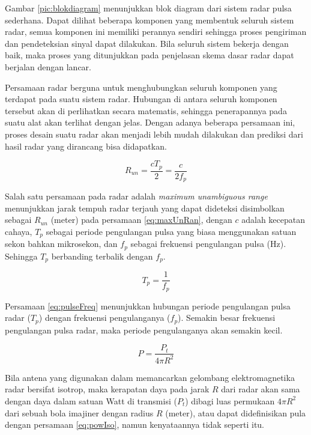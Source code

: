 Gambar \ref{pic:blokdiagram} menunjukkan blok diagram dari sistem radar pulsa sederhana. Dapat dilihat beberapa komponen yang membentuk seluruh sistem radar, semua komponen ini memiliki perannya sendiri sehingga proses pengiriman dan pendeteksian sinyal dapat dilakukan.  Bila seluruh sistem bekerja dengan baik, maka proses yang ditunjukkan pada penjelasan skema dasar radar dapat berjalan dengan lancar.

Persamaan radar berguna untuk menghubungkan seluruh komponen yang terdapat pada suatu sistem radar. Hubungan di antara seluruh komponen tersebut akan di perlihatkan secara matematis, sehingga penerapannya pada suatu alat akan terlihat dengan jelas. Dengan adanya beberapa persamaan ini, proses desain suatu radar akan menjadi lebih mudah dilakukan dan prediksi dari hasil radar yang dirancang bisa didapatkan.

\begin{equation}
	R_{un} = \frac{cT_{p}}{2} = \frac{c}{2f_{p}}
	\label{eq:maxUnRan}
\end{equation}

Salah satu persamaan pada radar adalah \textit{maximum unambiguous range} menunjukkan jarak tempuh radar terjauh yang dapat dideteksi disimbolkan sebagai $R_{un}$ (meter) pada persamaan \ref{eq:maxUnRan}, dengan $c$ adalah kecepatan cahaya, $T_{p}$ sebagai periode pengulangan pulsa yang biasa menggunakan satuan sekon bahkan mikrosekon, dan $f_{p}$ sebagai frekuensi pengulangan pulsa (Hz). Sehingga $T_{p}$ berbanding terbalik dengan $f_{p}$.

\begin{equation}
	T_{p} = \frac{1}{f_{p}}
	\label{eq:pulseFreq}
\end{equation}

Persamaan \ref{eq:pulseFreq} menunjukkan hubungan periode pengulangan pulsa radar ($T_{p}$) dengan frekuensi pengulanganya ($f_{p}$). Semakin besar frekuensi pengulangan pulsa radar, maka periode pengulanganya akan semakin kecil.

\begin{equation}
	P = \frac{P_{t}}{4\pi R^{2}}
	\label{eq:powIso}
\end{equation}

Bila antena yang digunakan dalam memancarkan gelombang elektromagnetika radar bersifat isotrop, maka kerapatan daya pada jarak $R$ dari radar akan sama dengan daya dalam satuan Watt di transmisi ($P_{t}$) dibagi luas permukaan $4\pi R^{2}$ dari sebuah bola imajiner dengan radius $R$ (meter), atau dapat didefinisikan pula dengan persamaan \ref{eq:powIso}, namun kenyataannya tidak seperti itu.

